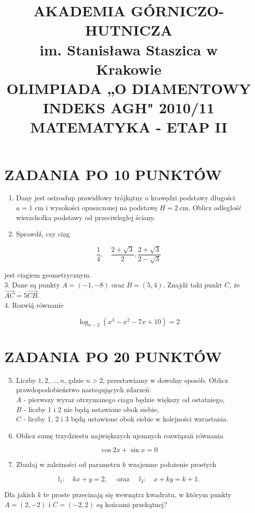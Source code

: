 \documentclass[10pt]{article}
\title{AKADEMIA GÓRNICZO-HUTNICZA \\
 im. Stanisława Staszica w Krakowie \\
 OLIMPIADA „O DIAMENTOWY INDEKS AGH" 2010/11 \\
 MATEMATYKA - ETAP II }
\author{}
\date{}
\begin{document}
\maketitle
\section*{ZADANIA PO 10 PUNKTÓW}
\begin{enumerate}
  \item Dany jest ostrosłup prawidłowy trójkątny o krawędzi podstawy długości $a=1$ cm i wysokości opuszczonej na podstawę $H=2 \mathrm{~cm}$. Oblicz odległość wierzchołka podstawy od przeciwległej ściany.
  \item Sprawdź, czy ciạg
\end{enumerate}

$$
\frac{1}{4}, \quad \frac{2+\sqrt{3}}{2}, \frac{2+\sqrt{3}}{2-\sqrt{3}}
$$

jest ciagiem geometrycznym.\\
3. Dane są punkty $A=(-1,-8)$ oraz $B=(5,4)$. Znajdź taki punkt $C$, że $\overrightarrow{A C}=5 \overrightarrow{C B}$.\\
4. Rozwią̇̇ równanie

$$
\log _{x-2}\left(x^{3}-x^{2}-7 x+10\right)=2
$$

\section*{ZADANIA PO 20 PUNKTÓW}
\begin{enumerate}
  \setcounter{enumi}{4}
  \item Liczby $1,2, \ldots, n$, gdzie $n>2$, przestawiamy w dowolny sposób. Oblicz prawdopodobieństwo nastequjących zdarzeń:\\
$A$ - pierwszy wyraz otrzymanego ciagu będzie większy od ostatniego,\\
$B$ - liczby 1 i 2 nie będą ustawione obok siebie,\\
$C$ - liczby 1, 2 i 3 będą ustawione obok siebie w kolejności wzrastania.
  \item Oblicz sumę trzydziestu największych ujemnych rozwiązań równania
\end{enumerate}

$$
\cos 2 x+\sin x=0
$$

\begin{enumerate}
  \setcounter{enumi}{6}
  \item Zbadaj w zależności od parametru $k$ wzajemne położenie prostych
\end{enumerate}

$$
l_{1}: \quad k x+y=2, \quad \text { oraz } \quad l_{2}: \quad x+k y=k+1 .
$$

Dla jakich $k$ te proste przecinają się wewnątrz kwadratu, w którym punkty $A=(2,-2)$ i $C=(-2,2)$ są końcami przekątnej?
\end{document}
